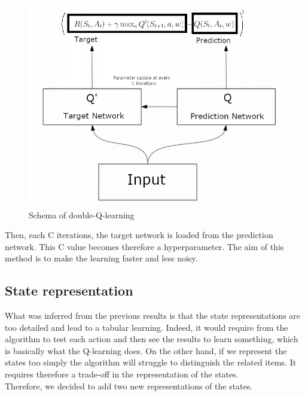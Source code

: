 \documentclass[a4paper]{article}
\begin{document}
            \begin{figure}[h!]
            \centering
            \includegraphics[scale = 0.5]{img/dqn_schema.png}
            \caption{Schema of double-Q-learning }
            \label{fig:my_label}
        \end{figure}
Then, each C iterations, the target network is loaded from the prediction network. This C value becomes therefore a hyperparameter. The aim of this method is to make the learning faster and less noisy.





\subsection{State representation} What was inferred from the previous results is that the state representations are too detailed and lead to a tabular learning. Indeed, it would require from the algorithm to test each action and then see the results to learn something, which is basically what the Q-learning does. On the other hand, if we represent the states too simply the algorithm will struggle to distinguish the related items. It requires therefore a trade-off in the representation of the states. \\
Therefore, we decided to add two new representations of the states. 
\end{document}

